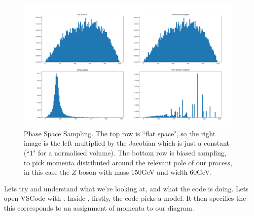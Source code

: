 \begin{figure}[H]
    \centering
    \includegraphics[width=0.75\linewidth]{tex/ims/phasespace1.png}
    \caption{Phase Space Sampling. The top row is ``flat space", so the right image is the left multiplied by the Jacobian which is just a constant (``$1$" for a normalised volume). The bottom row is biased sampling, to pick momenta distributed around the relevant pole of our process, in this case the $Z$ boson with mass 150GeV and width 60GeV.}
    \label{fig:enter-label}
\end{figure}


Lets try and understand what we're looking at, and what the code is doing. Lets open VSCode with . Inside , firstly, the code picks a model. It then specifies the  - this corresponds to an assignment of momenta to our diagram.
\begin{center}
\end{center}

